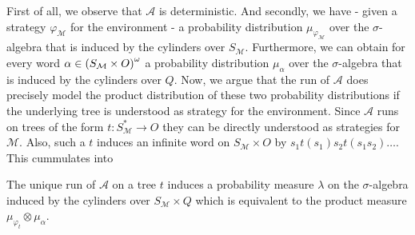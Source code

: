 First of all, we observe that $\mathcal{A}$ is deterministic. And secondly, we
have - given a strategy $\varphi_{\mathcal{M}}$ for the environment - a
probability distribution $\mu_{\varphi_{\mathcal{M}}}$ over the
$\sigma$-algebra that is induced by the cylinders over $S_{\mathcal{M}}$.
Furthermore, we can obtain for every word
$\alpha\in\left(S_{\mathcal{M}}\times O\right)^{\omega}$ a probability distribution
$\mu_{\alpha}$ over the $\sigma$-algebra that is induced by the cylinders over
$Q$. Now, we argue that the run of $\mathcal{A}$ does precisely model the
product distribution of these two probability distributions if the underlying
tree is understood as strategy for the environment. Since $\mathcal{A}$ runs on
trees of the form $t:S_{\mathcal{M}}^{*}\rightarrow O$ they can be directly
understood as strategies for $\mathcal{M}$. Also, such a $t$ induces an
infinite word on $S_{\mathcal{M}}\times O$ by
$s_{1}t(s_{1})s_{2}t(s_{1}s_{2})\dots$. This cummulates into
\begin{lemma}
  The unique run of $\mathcal{A}$ on a tree $t$ induces a probability measure
  $\lambda$ on the $\sigma$-algebra induced by the cylinders over
  $S_{\mathcal{M}}\times Q$ which is equivalent to the product measure
  $\mu_{\varphi_{t}}\otimes \mu_{\alpha}$.
  \label{lem:productmeasure}
\end{lemma}
